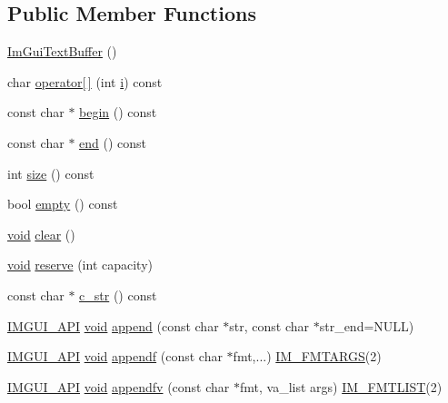 \subsection*{Public Member Functions}
\begin{DoxyCompactItemize}
\item 
\hyperlink{structImGuiTextBuffer_a4c4369c5e65f591554428b947c498d0d}{Im\+Gui\+Text\+Buffer} ()
\item 
char \hyperlink{structImGuiTextBuffer_a13748a5db12eb77d716d0347a552b310}{operator\mbox{[}$\,$\mbox{]}} (int \hyperlink{game__play__state_8cpp_acb559820d9ca11295b4500f179ef6392}{i}) const
\item 
const char $\ast$ \hyperlink{structImGuiTextBuffer_aab6d83c6b9a8061287a4cb6135c1cab4}{begin} () const
\item 
const char $\ast$ \hyperlink{structImGuiTextBuffer_a2fc30ad0d384f98dfcea722f798d91f2}{end} () const
\item 
int \hyperlink{structImGuiTextBuffer_a2811fcd43e0224eb3bd0f3464b634289}{size} () const
\item 
bool \hyperlink{structImGuiTextBuffer_affd606443a661cd0fcce0d381bc8cf98}{empty} () const
\item 
\hyperlink{imgui__impl__opengl3__loader_8h_ac668e7cffd9e2e9cfee428b9b2f34fa7}{void} \hyperlink{structImGuiTextBuffer_a9e4edc9f950bc9e35d5c3b3071dbc0df}{clear} ()
\item 
\hyperlink{imgui__impl__opengl3__loader_8h_ac668e7cffd9e2e9cfee428b9b2f34fa7}{void} \hyperlink{structImGuiTextBuffer_a3271f361e0f1997f4c3eb77665fdf161}{reserve} (int capacity)
\item 
const char $\ast$ \hyperlink{structImGuiTextBuffer_afb03439bc91723e274bfb9d247a691b9}{c\+\_\+str} () const
\item 
\hyperlink{imgui_8h_a43829975e84e45d1149597467a14bbf5}{I\+M\+G\+U\+I\+\_\+\+A\+PI} \hyperlink{imgui__impl__opengl3__loader_8h_ac668e7cffd9e2e9cfee428b9b2f34fa7}{void} \hyperlink{structImGuiTextBuffer_a9101840866a9e5408ea1e25a779a40dc}{append} (const char $\ast$str, const char $\ast$str\+\_\+end=N\+U\+LL)
\item 
\hyperlink{imgui_8h_a43829975e84e45d1149597467a14bbf5}{I\+M\+G\+U\+I\+\_\+\+A\+PI} \hyperlink{imgui__impl__opengl3__loader_8h_ac668e7cffd9e2e9cfee428b9b2f34fa7}{void} \hyperlink{structImGuiTextBuffer_a1c5892db030c5364823793f472754c9e}{appendf} (const char $\ast$fmt,...) \hyperlink{imgui_8h_a1251c2f9ddac0873dbad8181bd82c9f1}{I\+M\+\_\+\+F\+M\+T\+A\+R\+GS}(2)
\item 
\hyperlink{imgui_8h_a43829975e84e45d1149597467a14bbf5}{I\+M\+G\+U\+I\+\_\+\+A\+PI} \hyperlink{imgui__impl__opengl3__loader_8h_ac668e7cffd9e2e9cfee428b9b2f34fa7}{void} \hyperlink{structImGuiTextBuffer_ac8a6b11834c4cee8113bf6950e66112e}{appendfv} (const char $\ast$fmt, va\+\_\+list args) \hyperlink{imgui_8h_a047693beb7f899f5deab1e20202016b3}{I\+M\+\_\+\+F\+M\+T\+L\+I\+ST}(2)
\end{DoxyCompactItemize}
